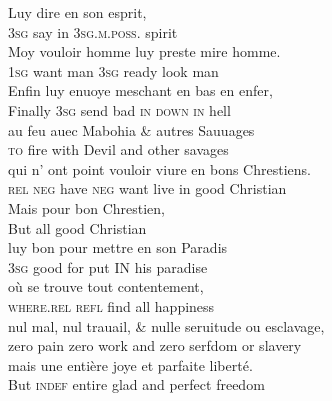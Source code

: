 \documentclass[output=paper,colorlinks,citecolor=brown]{langscibook}
\begin{document}
\ex \label{ex:bakker:14l}
\gll Luy dire en son esprit,\\
3\textsc{sg} say in 3\textsc{sg.m.poss.} spirit\\

\ex \label{ex:bakker:14m}
\gll Moy vouloir homme luy preste mire homme.\\
1\textsc{sg} want man 3\textsc{sg} ready look man\\

\ex \label{ex:bakker:14n}
\gll Enfin luy enuoye meschant en bas en enfer,\\
Finally 3\textsc{sg} send bad \textsc{in} \textsc{down} \textsc{in} hell\\

\ex \label{ex:bakker:14o}
\gll au feu auec Mabohia \& autres Sauuages\\
\textsc{to} fire with Devil and other savages\\

\ex \label{ex:bakker:14p}
\gll qui n' ont point vouloir viure en bons Chrestiens.\\
\textsc{rel} \textsc{neg} have \textsc{neg}  want live in good Christian\\

\ex \label{ex:bakker:14q}
\gll Mais pour bon Chrestien,\\
But all good Christian\\

\ex \label{ex:bakker:14r}
\gll luy bon pour mettre en son Paradis\\
3\textsc{sg} good for put IN his paradise\\

\ex \label{ex:bakker:14s}
\gll où se trouve tout contentement,\\
\textsc{where.rel} \textsc{refl} find all    happiness\\

\ex \label{ex:bakker:14t}
\gll nul mal, nul trauail, \& nulle seruitude ou esclavage,\\
zero pain zero work and zero serfdom or slavery\\

\ex \label{ex:bakker:14u}
\gll mais une entière joye et parfaite liberté.\\
But \textsc{indef} entire glad and perfect freedom\\
\end{document}
